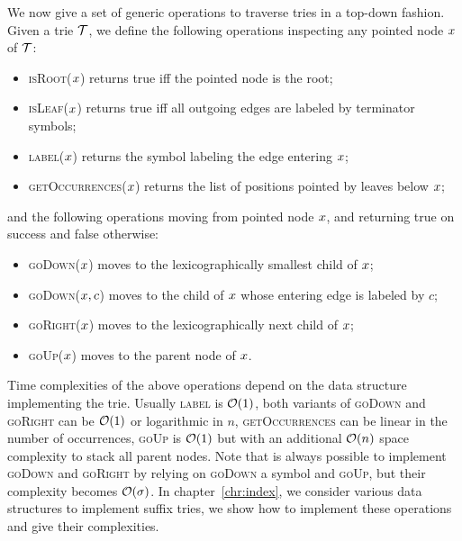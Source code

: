 We now give a set of generic operations to traverse tries in a top-down fashion.
Given a trie $\mathcal {T}$, we define the following operations inspecting any pointed node $x$ of $\mathcal {T}$:
\begin{itemize}
\item \textsc{isRoot}($x$) returns true iff the pointed node is the root;
\item \textsc{isLeaf}($x$) returns true iff all outgoing edges are labeled by terminator symbols;
\item \textsc{label}($x$) returns the symbol labeling the edge entering $x$;
\item \textsc{getOccurrences}($x$) returns the list of positions pointed by leaves below $x$;
\end{itemize}
and the following operations moving from pointed node $x$, and returning true on success and false otherwise:
\begin{itemize}
\item \textsc{goDown}($x$) moves to the lexicographically smallest child of $x$;
\item \textsc{goDown}($x, c$) moves to the child of $x$ whose entering edge is labeled by $c$;
\item \textsc{goRight}($x$) moves to the lexicographically next child of $x$;
\item \textsc{goUp}($x$) moves to the parent node of $x$.
\end{itemize}

Time complexities of the above operations depend on the data structure implementing the trie.
Usually \textsc{label} is $\mathcal{O}(1)$, both variants of \textsc{goDown} and \textsc{goRight} can be $\mathcal{O}(1)$ or logarithmic in $n$, \textsc{getOccurrences} can be linear in the number of occurrences, \textsc{goUp} is $\mathcal{O}(1)$ but with an additional $\mathcal{O}(n)$ space complexity to stack all parent nodes.
Note that is always possible to implement \textsc{goDown} and \textsc{goRight} by relying on \textsc{goDown} a symbol and \textsc{goUp}, but their complexity becomes $\mathcal{O}(\sigma)$.
In chapter~\ref{chr:index}, we consider various data structures to implement suffix tries, we show how to implement these operations and give their complexities.


